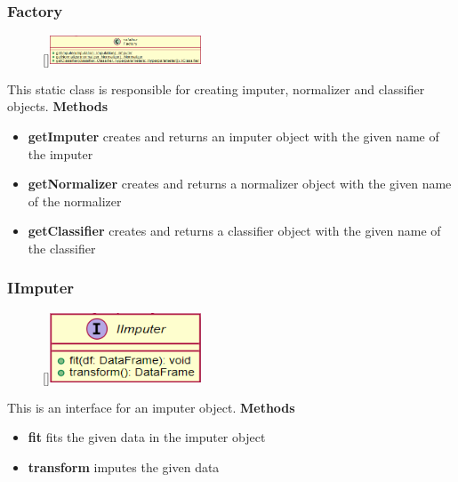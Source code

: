 \subsubsection{Factory}
\label{Factory}
\begin{figure}
    \raisebox{0pt}[\dimexpr{}\baselineskip\relax]{\includegraphics[width=4.5cm]{classes/model-management/8.png}}
\end{figure} 
\par
This static class is responsible for creating imputer, normalizer and classifier objects.
\newline
\newline
\textbf{Methods}
\begin{itemize}
    \item \textbf{getImputer} creates and returns an imputer object with the given name of the imputer
    \item \textbf{getNormalizer} creates and returns a normalizer object with the given name of the normalizer
    \item \textbf{getClassifier} creates and returns a classifier object with the given name of the classifier
\end{itemize}

\subsubsection{IImputer}
\label{IImputer}
\begin{figure}
    \raisebox{0pt}[\dimexpr{}\baselineskip\relax]{\includegraphics[width=4.5cm]{classes/model-management/9.png}}
\end{figure} 
\par
This is an interface for an imputer object.
\newline
\newline
\textbf{Methods}
\begin{itemize}
    \item \textbf{fit} fits the given data in the imputer object
    \item \textbf{transform} imputes the given data
\end{itemize}

